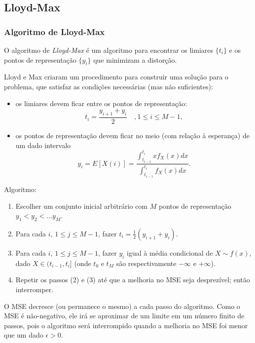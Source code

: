 \subsection{Lloyd-Max}
\begin{frame}[allowframebreaks]
  \frametitle{Algoritmo de Lloyd-Max}
  O algoritmo de \emph{Lloyd-Max} é um algoritmo para encontrar os limiares $\{t_i\}$ e
  os pontos de representação $\{y_i\}$ que minimizam a distorção.

  Lloyd e Max criaram um procedimento para construir uma solução para o problema, que satisfaz
  as condições necessárias (mas não suficientes):

  \begin{itemize}
  \item os limiares devem ficar entre os pontos de representação:
        \begin{equation}
        t_i = \frac{y_{i+1} + y_{i}}{2} \quad , 1 \leq i \leq M-1 , 
        \end{equation}
  \item os pontos de representação devem ficar no meio (com relação à esperança) de um dado intervalo
        \begin{equation}
        y_i = E [ X(i) ] = \frac{ \int_{t_{i-1}}^{t_i} x f_X (x) dx }{ \int_{t_{i-1}}^{t_i} f_X (x) dx  } .
        \end{equation}
  \end{itemize}

  \framebreak
  Algoritmo:
  \begin{enumerate}
  \item Escolher um conjunto inicial arbitrário com $M$ pontos de representação $y_1 < y_2 < \ldots y_M$.
  \item Para cada $i$, $1 \leq j \leq M-1$, fazer $t_i = \frac{1}{2} (y_{i+1} + y_i)$.
  \item Para cada $i$, $1 \leq j \leq M-1$, fazer $y_i$ igual à média condicional de $X \sim f(x)$,
        dado $X \in (t_{i-1}, t_i]$ (onde $t_0$ e $t_M$ são respectivamente $-\infty$ e $+\infty$).
  \item Repetir os passos (2) e (3) até que a melhoria no MSE seja desprezível; então interromper.
  \end{enumerate}
  O MSE decresce (ou permanece o mesmo) a cada passo do algoritmo. Como o MSE é não-negativo,
  ele irá se aproximar de um limite em um número finito de passos, pois o algoritmo será interrompido
  quando a melhoria no MSE foi menor que um dado $\epsilon > 0$.


\end{frame}

